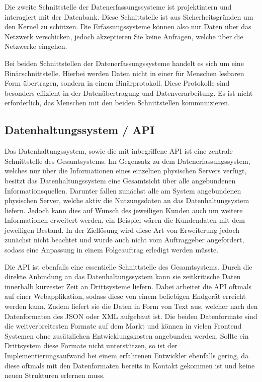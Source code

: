 Die zweite Schnittstelle der Datenerfassungssysteme ist projektintern und
interagiert mit der Datenbank. Diese Schnittstelle ist aus Sicherheitsgründen
 um den Kernel zu schützen. Die
Erfassungssysteme können also nur Daten über das Netzwerk verschicken, jedoch
akzeptieren Sie keine Anfragen, welche über die Netzwerke eingehen.

Bei beiden Schnittstellen der Datenerfassungssysteme handelt es sich um eine
Binärschnittstelle. Hierbei werden Daten nicht in einer für Menschen lesbaren
Form übertragen, sondern in einem Binärprotokoll. Diese Protokolle sind
besonders effizient in der Datenübertragung und Datenverarbeitung. Es ist nicht
erforderlich, das Menschen mit den beiden Schnittstellen kommunizieren.
\tm%

\subsection{Datenhaltungssystem / API}
Das Datenhaltungssystem, sowie die mit inbegriffene API ist eine zentrale
Schnittstelle des Gesamtsystems. Im Gegensatz zu dem Datenerfassungssystem,
welches nur über die Informationen eines einzelnen physischen Servers verfügt,
besitzt das Datenhaltungssystem eine Gesamtsicht über alle angebundenen
Informationsquellen. Darunter fallen zunächst alle am System angebundenen
physischen Server, welche aktiv die Nutzungsdaten an das Datenhaltungsystem
liefern. Jedoch kann dies auf Wunsch des jeweiligen Kunden auch um weitere
Informationen erweitert werden, ein Beispiel wären die Kundendaten mit dem
jeweiligen Bestand. In der Ziellösung wird diese Art von Erweiterung
jedoch zunächst nicht beachtet und wurde auch nicht vom Auftraggeber
angefordert, sodass eine Anpassung in einem Folgeauftrag erledigt werden
müsste.

Die API ist ebenfalls eine essentielle Schnittstelle des Gesamtsystems. Durch
die direkte Anbindung an das Datenhaltungssystem kann sie zeitkritische Daten
innerhalb kürzester Zeit an Drittsysteme liefern. Dabei arbeitet die API
oftmals auf einer Webapplikation, sodass diese von einem beliebigen Endgerät
erreicht werden kann. Zudem liefert sie die Daten in Form von Text aus, welcher
nach den Datenformaten des JSON oder XML aufgebaut ist. Die beiden Datenformate
sind die weitverbreitesten Formate auf dem Markt und können in vielen
Frontend Systemen ohne zusätzlichen Entwicklungskosten angebunden werden.
Sollte ein Drittsystem diese Formate nicht unterstützen, so ist der
Implementierungsaufwand bei einem erfahrenen Entwickler ebenfalls gering,
da diese oftmals mit den Datenformaten bereits in Kontakt gekommen ist
und keine neuen Strukturen erlernen muss.
\nl%

